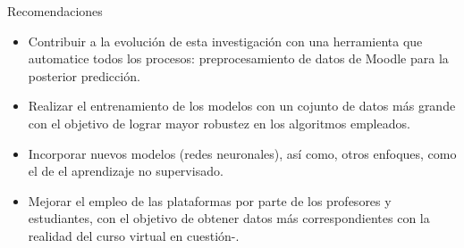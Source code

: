 \begin{recomendations}
    Recomendaciones 

    \begin{itemize}
        \item Contribuir a la evolución de esta investigación con una herramienta que automatice todos los procesos: preprocesamiento de datos de Moodle para la posterior predicción. 
        \item Realizar el entrenamiento de los modelos con un cojunto de datos más grande con el objetivo de lograr mayor robustez en los algoritmos empleados. 
        \item Incorporar nuevos modelos (redes neuronales), así como, otros enfoques, como el de el aprendizaje no supervisado.
        \item Mejorar el empleo de las plataformas por parte de los profesores y estudiantes, con el objetivo de obtener datos más correspondientes con la realidad del curso virtual en cuestión-.
    \end{itemize}


\end{recomendations}
